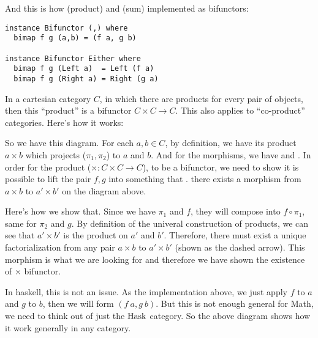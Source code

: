And this is how \code{(,)} (product) and  (sum) implemented as bifunctors:

\begin{lstlisting}
instance Bifunctor (,) where
  bimap f g (a,b) = (f a, g b)

instance Bifunctor Either where
  bimap f g (Left a)  = Left (f a)
  bimap f g (Right a) = Right (g a)
\end{lstlisting}

In a cartesian category $C$, in which there are products for every pair of
objects, then this ``product'' is a bifunctor $C\times C \to C$. This also
applies to ``co-product'' categories. Here's how it works:

\begin{center}
\end{center}

So we have this diagram. For each $a, b \in C$, by definition, we have its
product $a\times b$ which projects ($\pi_1, \pi_2$) to $a$ and $b$. And for the
morphisms, we have  and . In order for
the product ($\times : C\times C \to C$), to be a bifunctor, we need to show it
is possible to lift the pair $f, g$ into something that
. \ie there exists a
morphism from $a\times b$ to $a'\times b'$ on the diagram above.

\begin{center}
\end{center}

Here's how we show that. Since we have $\pi_1$ and $f$, they will compose into
$f \circ \pi_1$, same for $\pi_2$ and $g$. By definition of the univeral
construction of products, we can see
that $a'\times b'$ is the product on $a'$ and $b'$. Therefore, there must exist a unique
factorialization from any pair $a\times b$ to $a'\times b'$ (shown as the dashed arrow).
This morphism is what we are looking for and therefore we have shown the
existence of $\times$ bifunctor.

In haskell, this is not an issue. As the implementation above, we just apply $f$
to $a$ and $g$ to $b$, then we will form $(f~a, g~b)$. But this is not enough
general for Math, we need to think out of just the $\mathrm{Hask}$ category. So the
above diagram shows how it work generally in any category.